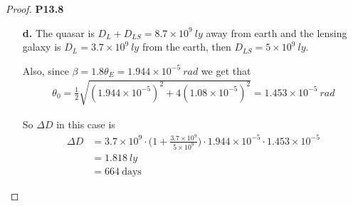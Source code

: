\documentclass[11pt]{article}
\theoremstyle{definition}
\begin{document}
\begin{proof}{\textbf{P13.8}}
\begin{itemize}
\cleardoublepage
\item [\textbf{d.}] The quasar is $D_{L} + D_{LS} = 8.7 \times 10^9~ly$
away from earth and the lensing galaxy is $D_L = 3.7 \times 10^9~ly$
from the earth, then $D_{LS} = 5 \times 10^{9}~ly$.

Also, since $\beta = 1.8 \theta_E = 1.944\times 10^{-5}~rad$ we get that
\begin{align*}
    \theta_0 = \frac{1}{2}\sqrt{
        (1.944 \times 10^{-5})^2 + 4(1.08\times 10^{-5})^2
    } = 1.453 \times 10^{-5}~rad
\end{align*}

So $\Delta D$ in this case is
\begin{align*}
    \Delta D &=
    3.7\times 10^9 \cdot \bigg(1 + \frac{3.7 \times 10^9}{5 \times 10^9}\bigg)
    \cdot 1.944 \times 10^{-5} \cdot 1.453 \times 10^{-5}\\
    &= 1.818~ly\\
    &= 664~\text{days}
\end{align*}
\end{itemize}
\end{proof}
\end{document}
